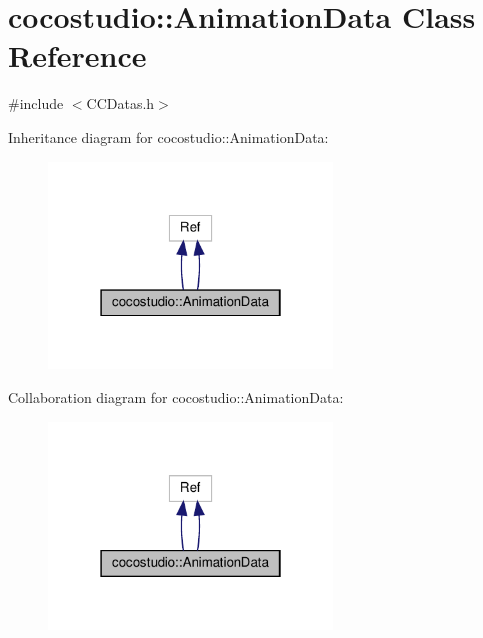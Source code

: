 \hypertarget{classcocostudio_1_1AnimationData}{}\section{cocostudio\+:\+:Animation\+Data Class Reference}
\label{classcocostudio_1_1AnimationData}


{\ttfamily \#include $<$C\+C\+Datas.\+h$>$}



Inheritance diagram for cocostudio\+:\+:Animation\+Data\+:
\nopagebreak
\begin{figure}[H]
\begin{center}
\leavevmode
\includegraphics[width=214pt]{classcocostudio_1_1AnimationData__inherit__graph}
\end{center}
\end{figure}


Collaboration diagram for cocostudio\+:\+:Animation\+Data\+:
\nopagebreak
\begin{figure}[H]
\begin{center}
\leavevmode
\includegraphics[width=214pt]{classcocostudio_1_1AnimationData__coll__graph}
\end{center}
\end{figure}
